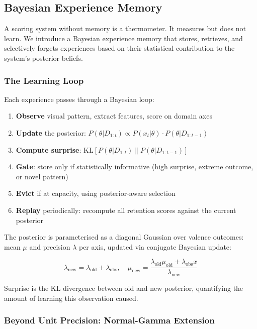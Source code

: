 \documentclass[11pt]{article}
\begin{document}
\subsection{Bayesian Experience Memory}

A scoring system without memory is a thermometer. It measures but does not learn. We introduce a Bayesian experience memory that stores, retrieves, and selectively forgets experiences based on their statistical contribution to the system's posterior beliefs.

\subsubsection{The Learning Loop}

Each experience passes through a Bayesian loop:

\begin{enumerate}
    \item \textbf{Observe} visual pattern, extract features, score on domain axes
    \item \textbf{Update} the posterior: $P(\theta | D_{1:t}) \propto P(x_t | \theta) \cdot P(\theta | D_{1:t-1})$
    \item \textbf{Compute surprise}: $\mathrm{KL}[P(\theta | D_{1:t}) \| P(\theta | D_{1:t-1})]$
    \item \textbf{Gate}: store only if statistically informative (high surprise, extreme outcome, or novel pattern)
    \item \textbf{Evict} if at capacity, using posterior-aware selection
    \item \textbf{Replay} periodically: recompute all retention scores against the current posterior
\end{enumerate}

The posterior is parameterised as a diagonal Gaussian over valence outcomes: mean $\mu$ and precision $\lambda$ per axis, updated via conjugate Bayesian update:

\begin{equation}
\lambda_{\text{new}} = \lambda_{\text{old}} + \lambda_{\text{obs}}, \quad \mu_{\text{new}} = \frac{\lambda_{\text{old}} \mu_{\text{old}} + \lambda_{\text{obs}} x}{\lambda_{\text{new}}}
\end{equation}

Surprise is the KL divergence between old and new posterior, quantifying the amount of learning this observation caused.

\subsubsection{Beyond Unit Precision: Normal-Gamma Extension}
\end{document}
